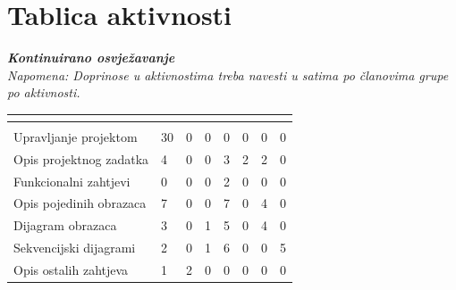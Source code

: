 		\eject
		\section*{Tablica aktivnosti}
		
			\textbf{\textit{Kontinuirano osvježavanje}}\\
			
			 \textit{Napomena: Doprinose u aktivnostima treba navesti u satima po članovima grupe po aktivnosti.}
					
			\begin{longtabu} to \textwidth {|X[7, l]|X[1, c]|X[1, c]|X[1, c]|X[1, c]|X[1, c]|X[1, c]|X[1, c]|}
								
				  &      &   &	 &	 &
				 &
				 &	 \\ \hline 
				\endfirsthead
				
			
				  &      &  &	 &
				 &	 &
				 &	 \\ \hline 
				\endhead
				
				
				\endfoot
							
				 
				\endlastfoot
				
				Upravljanje projektom 		& 30  & 0  & 0 &  0 & 0  & 0 & 0 \\ \hline
				Opis projektnog zadatka 	&  4& 0 & 0 & 3 & 2 & 2 &0 \\ \hline
				Funkcionalni zahtjevi       & 0 & 0 &0  & 2 & 0 & 0 &0  \\ \hline
				Opis pojedinih obrazaca 	&  7& 0 &  0&  7&  0& 4 & 0 \\ \hline
				Dijagram obrazaca 			&  3& 0 & 1 &  5& 0& 4 & 0 \\ \hline
				Sekvencijski dijagrami 		&  2& 0 & 1 & 6 & 0 & 0 &5  \\ \hline
				Opis ostalih zahtjeva 		&  1& 2 & 0 & 0 & 0 & 0 & 0 \\ \hline


\end{longtabu}
